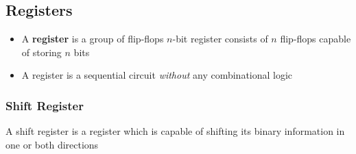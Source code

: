 \subsection{Registers}
\begin{itemize}
	\item A \textbf{register} is a group of flip-flops
	\subitem $n$-bit register consists of $n$ flip-flops capable of storing $n$ bits
	\item A register is a sequential circuit \textit{without} any combinational logic
\end{itemize}

\subsubsection{Shift Register}
A shift register is a register which is capable of shifting its binary information in one or both directions